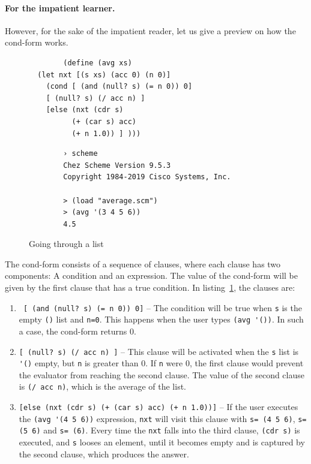 \documentclass[a4paper,12pt]{book}
\newenvironment{fmpage}[1]
{\begin{lrbox}{\fmbox}\begin{minipage}{#1}}
{\end{minipage}\end{lrbox}\fbox{\usebox{\fmbox}}}
\begin{document}
\pagebreak
\paragraph{For the impatient learner.}
However, for the sake of the impatient reader,
let us give a preview on
how the cond-form works.

\begin{figure}[!h]
	\begin{fmpage}{0.9\textwidth}
		\begin{verbatim}
		(define (avg xs)
  (let nxt [(s xs) (acc 0) (n 0)] 
    (cond [ (and (null? s) (= n 0)) 0]
	[ (null? s) (/ acc n) ]
	[else (nxt (cdr s) 
	      (+ (car s) acc) 
	      (+ n 1.0)) ] )))
		\end{verbatim}
	\end{fmpage}

	\begin{fmpage}{0.9\textwidth}
		\begin{verbatim}
		› scheme
		Chez Scheme Version 9.5.3
		Copyright 1984-2019 Cisco Systems, Inc.

		> (load "average.scm")
		> (avg '(3 4 5 6))
		4.5
		\end{verbatim}
	\end{fmpage}
	\caption{Going through a list}
	\label{going-through-a-list}
\end{figure}

The cond-form consists of a sequence
of clauses, where each clause has two
components: A condition and an expression.
The value of the cond-form will be given by
the first clause that has a true condition.
In listing~\ref{going-through-a-list}, the
clauses are:
\begin{enumerate}
	\item \verb| [ (and (null? s) (= n 0)) 0]| --
		The condition will be true when \verb|s| is the empty
		\verb|()| list and \verb|n=0|. This happens when the
		user types \verb|(avg '())|. In such a case, the
		cond-form returns 0.
	\item \verb|[ (null? s) (/ acc n) ]| -- This clause
		will be activated when the \verb|s| list is
		\verb|'()| empty, but \verb|n| is greater than 0.
		If \verb|n| were 0, the first clause would prevent
		the evaluator from reaching the second clause. The
		value of the second clause is \verb|(/ acc n)|,
		which is the average of the list.
	\item \verb|[else (nxt (cdr s) (+ (car s) acc) (+ n 1.0))]| --
		If the user executes the \verb|(avg '(4 5 6))| expression,
		\verb|nxt| will visit this clause with \verb|s= (4 5 6)|,
		\verb|s= (5 6)| and \verb|s= (6)|. Every time the \verb|nxt|
		falls into the third clause, \verb|(cdr s)| is executed, and
		\verb|s| looses an element, until it becomes empty and is
		captured by the second clause, which produces the answer.
\end{enumerate}
\end{document}
